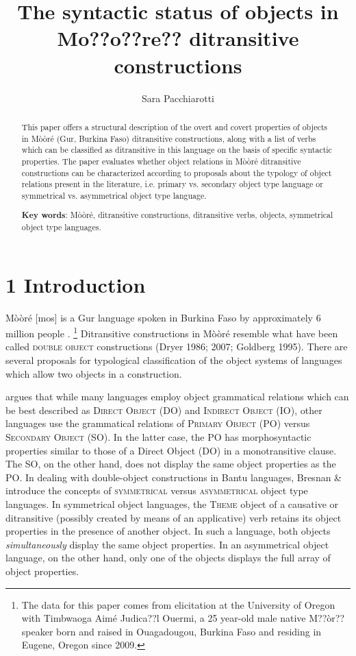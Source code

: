\documentclass[output=paper]{langsci/langscibook}
\title{The syntactic status of objects in {Mo??o??re??} ditransitive constructions}
\author{%
 Sara Pacchiarotti\affiliation{University of Oregon}
}
\begin{document}
\begin{abstract}
This paper offers a structural description of the overt and covert properties of objects in M\`{o}\`{o}r\'{e} (Gur, Burkina Faso) ditransitive constructions, along with a list of verbs which can be classified as ditransitive in this language on the basis of specific syntactic properties. The paper evaluates whether object relations in M\`{o}\`{o}r\'{e} ditransitive constructions can be characterized according to proposals about the typology of object relations present in the literature, i.e. primary vs. secondary object type language or symmetrical vs. asymmetrical object type language. 
\end{abstract}

\begin{abstract}
\textbf{Key words}: M\`{o}\`{o}r\'{e}, ditransitive constructions, ditransitive verbs, objects, symmetrical object type languages.  
\end{abstract}

\chapter[1 Introduction]{1 Introduction}

M\`{o}\`{o}r\'{e} [mos] is a Gur language spoken in Burkina Faso by approximately 6 million people \citep{LewisEtAl2016}.{ }\footnote{ The data for this paper comes from elicitation at the University of Oregon with Timbwaoga Aim\'{e} Judica??l Ouermi, a 25 year-old male native M??\`{o}r?? speaker born and raised in Ouagadougou, Burkina Faso and residing in Eugene, Oregon since 2009.}\textsuperscript{ } Ditransitive constructions in M\`{o}\`{o}r\'{e} resemble what have been called \textsc{double object} constructions (Dryer 1986; 2007; Goldberg 1995). There are several proposals for typological classification of the object systems of languages which allow two objects in a construction.

\citet{Dryer1986} argues that while many languages employ object grammatical relations which can be best described as \textsc{Direct Object} (DO) and \textsc{Indirect Object }(IO), other languages use the grammatical relations of \textsc{Primary Object} (PO) versus \textsc{Secondary Object} (SO). In the latter case, the PO has morphosyntactic properties similar to those of a Direct Object (DO) in a monotransitive clause. The SO, on the other hand, does not display the same object properties as the PO. In dealing with double-object constructions in Bantu languages, Bresnan \& \citet{Moshi1990} introduce the concepts of \textsc{symmetrical} versus \textsc{asymmetrical} object type languages. In symmetrical object languages, the \textsc{Theme} object of a causative or ditransitive (possibly created by means of an applicative) verb retains its object properties in the presence of another object. In such a language, both objects \textit{simultaneously }display the same object properties. In an asymmetrical object language, on the other hand, only one of the objects displays the full array of object properties. 
\end{document}
